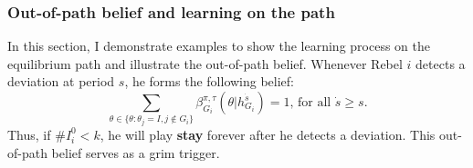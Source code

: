 \documentclass[12pt,letter]{article}
\newcommand{\Kappa}{\mathrm{K}}
\theoremstyle{definition}
\theoremstyle{remark}
\theoremstyle{claim}
\begin{document}
\clearpage






\subsubsection{Out-of-path belief and learning on the path}
In this section, I demonstrate examples to show the learning process on the equilibrium path and illustrate the out-of-path belief. Whenever Rebel $i$ detects a deviation at period $s$, he forms the following belief: 
\begin{equation}
\label{eq_grim_trigger}
\sum_{\theta \in \{\theta:\theta_j=I,j\notin G_i\}}\beta^{\pi,\tau}_{G_i}({\theta}|h^{\dot{s}}_{G_i})=1 \text{, for all $\dot{s}\geq s$}.
\end{equation}
Thus, if $\# I^0_i<k$, he will play \textbf{stay} forever after he detects a deviation. This out-of-path belief serves as a grim trigger. 
\end{document}

